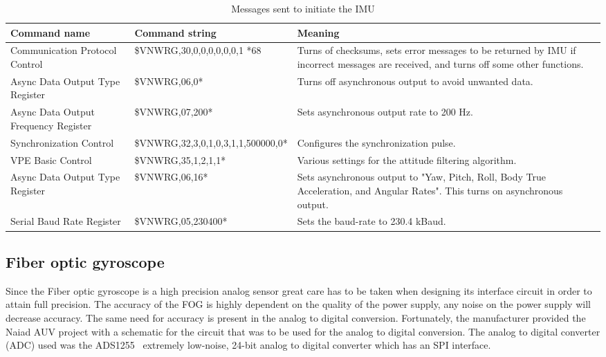 \begin{table*}
\centering
    \caption{Messages sent to initiate the IMU}
    \begin{tabular}{|p{2.5cm}|l|p{6cm}|} \hline
    \label{table:IMU_messages}
    	\textbf{Command name} & \textbf{Command string} & \textbf{Meaning} \\ \hline
        Communication Protocol Control & \$VNWRG,30,0,0,0,0,0,0,1 *68 & Turns of checksums, sets error messages to be returned by IMU if incorrect messages are received, and turns off some other functions. \\ \hline
        Async Data Output Type Register & \$VNWRG,06,0* & Turns off asynchronous output to avoid unwanted data. \\ \hline
        Async Data Output Frequency Register & \$VNWRG,07,200* & Sets asynchronous output rate to 200 Hz. \\ \hline        
        Synchronization Control & \$VNWRG,32,3,0,1,0,3,1,1,500000,0* & Configures the synchronization pulse. \\ \hline
        VPE Basic Control & \$VNWRG,35,1,2,1,1* & Various settings for the attitude filtering algorithm. \\ \hline
        Async Data Output Type Register & \$VNWRG,06,16* & Sets asynchronous output to "Yaw, Pitch, Roll, Body True Acceleration, and Angular Rates". This turns on asynchronous output. \\ \hline
        Serial Baud Rate Register & \$VNWRG,05,230400* & Sets the baud-rate to 230.4 kBaud. \\ \hline        
    \end{tabular}
\end{table*}




\subsection{Fiber optic gyroscope}
Since the Fiber optic gyroscope is a high precision analog sensor great care has to be taken when designing its interface circuit in order to attain full precision. \newline
The accuracy of the FOG is highly dependent on the quality of the power supply, any noise on the power supply will decrease accuracy. The same need for accuracy is present in the analog to digital conversion. Fortunately, the manufacturer provided the Naiad AUV project with a schematic for the circuit that was to be used for the analog to digital conversion. The analog to digital converter (ADC) used was the ADS1255~\cite{web:ads1255} extremely low-noise, 24-bit analog to digital converter which has an SPI interface.

